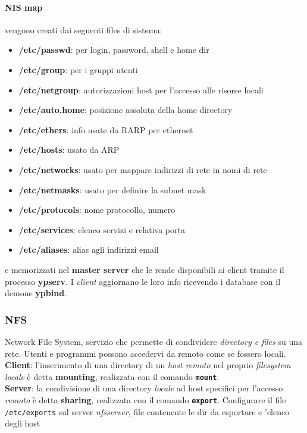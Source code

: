 \documentclass[a4paper,11pt]{article}
\def\code#1{\texttt{#1}}
\begin{document}
\paragraph{NIS map} vengono creati dai seguenti files di sistema:
\begin{itemize}
\item \textbf{/etc/passwd}: per login, password, shell e home dir
\item \textbf{/etc/group}: per i gruppi utenti
\item \textbf{/etc/netgroup}: autorizzazioni host per l'accesso alle risorse locali
\item \textbf{/etc/auto.home}: posizione assoluta della home directory
\item \textbf{/etc/ethers}: info usate da RARP per ethernet
\item \textbf{/etc/hosts}: usato da ARP
\item \textbf{/etc/networks}: usato per mappare indirizzi di rete in nomi di rete
\item \textbf{/etc/netmasks}: usato per definire la subnet mask
\item \textbf{/etc/protocols}: nome protocollo, numero 
\item \textbf{/etc/services}: elenco servizi e relativa porta
\item \textbf{/etc/aliases}: alias agli indirizzi email
\end{itemize}
e memorizzati nel \textbf{master server} che le rende disponibili ai client tramite il processo \textbf{ypserv}. I \textit{client} aggiornano le loro info ricevendo i database con il demone \textbf{ypbind}.
\newpage
\subsubsection{NFS}
Network File System, servizio che permette di condividere \textit{directory e files }su una rete. Utenti e programmi possono accedervi da remoto come se fossero locali.\\
\textbf{Client}: l'inserimento di una directory di un \textit{host remoto} nel proprio \textit{filesystem locale} è detta \textbf{mounting}, realizzata con il comando \textbf{\code{mount}}.\\
\textbf{Server}: la condivisione di una directory \textit{locale} ad host specifici per l'accesso \textit{remoto} è detta \textbf{sharing}, realizzata con il comando \textbf{\code{export}}. Configurare il file \code{/etc/exports} sul server \textit{nfsserver}, file contenente le dir da esportare e 'elenco degli host
\end{document}
